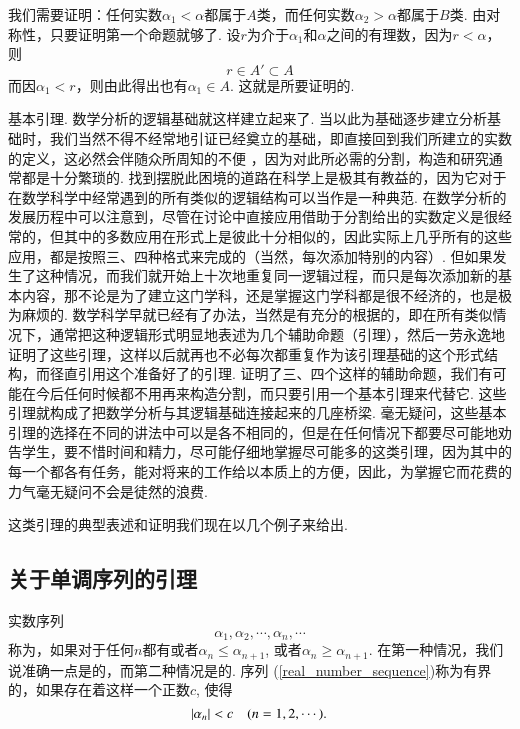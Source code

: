 \documentclass[color=cyan,mathpazo,titlestyle=hang]{elegantbook_mac}
\begin{document}
我们需要证明：任何实数$\alpha_1<\alpha$都属于$A$类，而任何实数$\alpha_2>\alpha$都属于$B$类. 由对称性，只要证明第一个命题就够了. 设$r$为介于$\alpha_1$和$\alpha$之间的有理数，因为$r<\alpha$，则
$$r\in A' \subset A$$
而因$\alpha_1<r$，则由此得出也有$\alpha_1\in A$. 这就是所要证明的. 

\textsf{基本引理}. 数学分析的逻辑基础就这样建立起来了. 当以此为基础逐步建立分析基础时，我们当然不得不经常地引证已经奠立的基础，即直接回到我们所建立的实数的定义，这必然会伴随众所周知的不便 ，因为对此所必需的分割，构造和研究通常都是十分繁琐的. 找到摆脱此困境的道路在科学上是极其有教益的，因为它对于在数学科学中经常遇到的所有类似的逻辑结构可以当作是一种典范. 在数学分析的发展历程中可以注意到，尽管在讨论中直接应用借助于分割给出的实数定义是很经常的，但其中的多数应用在形式上是彼此十分相似的，因此实际上几乎所有的这些应用，都是按照三、四种格式来完成的（当然，每次添加特别的内容）. 但如果发生了这种情况，而我们就开始上十次地重复同一逻辑过程，而只是每次添加新的基本内容，那不论是为了建立这门学科，还是掌握这门学科都是很不经济的，也是极为麻烦的. 数学科学早就已经有了办法，当然是有充分的根据的，即在所有类似情况下，通常把这种逻辑形式明显地表述为几个辅助命题（引理），然后一劳永逸地证明了这些引理，这样以后就再也不必每次都重复作为该引理基础的这个形式结构，而径直引用这个准备好了的引理. 证明了三、四个这样的辅助命题，我们有可能在今后任何时候都不用再来构造分割，而只要引用一个基本引理来代替它. 这些引理就构成了把数学分析与其逻辑基础连接起来的几座桥梁. 毫无疑问，这些基本引理的选择在不同的讲法中可以是各不相同的，但是在任何情况下都要尽可能地劝告学生，要不惜时间和精力，尽可能仔细地掌握尽可能多的这类引理，因为其中的每一个都各有任务，能对将来的工作给以本质上的方便，因此，为掌握它而花费的力气毫无疑问不会是徒然的浪费. 

这类引理的典型表述和证明我们现在以几个例子来给出. 

\subsection{关于单调序列的引理}
实数序列
\begin{equation}
\alpha_1, \alpha_2, \cdots, \alpha_n, \cdots
\label{real_number_sequence}
\end{equation}
称为，如果对于任何$n$都有或者$\alpha_n\leqslant \alpha_{n+1}$, 或者$\alpha_n \geqslant \alpha_{n+1}$. 在第一种情况，我们说准确一点是的，而第二种情况是的. 序列 (\ref{real_number_sequence})称为有界的，如果存在着这样一个正数$c$, 使得
$$\abs{\alpha_n}<c \hspace{10pt} (n=1,2,\cdots).$$
\end{document}
